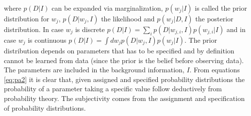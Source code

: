 where $p(D|I)$ can be expanded via marginalization, $p(w_j|I)$ is called the prior distribution for $w_j$, $p(D|w_j,I)$ the likelihood and $p(w_j|D,I)$ the posterior distribution. In case $w_j$ is discrete $p(D|I) = \sum_{i}p(D|w_{j,i},I)p(w_{j,i}|I)$ and in case $w_j$ is continuous $p(D|I) = \int dw_j p(D|w_j,I)p(w_j|I)$. The prior distribution depends on parameters that has to be specified and by definition cannot be learned from data (since the prior is the belief before observing data). The parameters are included in the background information, $I$.\newline
From equations \eqref{eq:pa2} it is clear that, given assigned and specified probability distributions the probability of a parameter taking a specific value follow deductively from probability theory. The subjectivity comes from the assignment and specification of probability distributions. 

